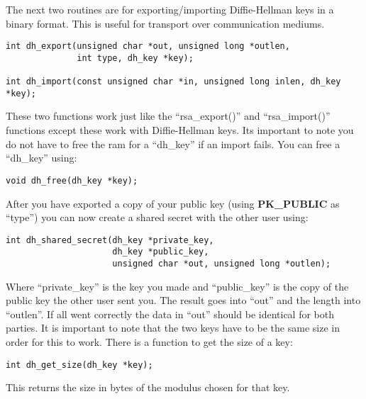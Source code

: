 \documentclass[b5paper]{book}
\begin{document}
The next two routines are for exporting/importing Diffie-Hellman keys in a binary format.  This is useful for transport
over communication mediums.  

 
\begin{verbatim}
int dh_export(unsigned char *out, unsigned long *outlen, 
              int type, dh_key *key);

int dh_import(const unsigned char *in, unsigned long inlen, dh_key *key);
\end{verbatim}

These two functions work just like the ``rsa\_export()'' and ``rsa\_import()'' functions except these work with 
Diffie-Hellman keys. Its important to note you do not have to free the ram for a ``dh\_key'' if an import fails.  You can free a 
``dh\_key'' using:
\begin{verbatim}
void dh_free(dh_key *key);
\end{verbatim}
After you have exported a copy of your public key (using {\bf PK\_PUBLIC} as ``type'') you can now create a shared secret 
with the other user using:
\begin{verbatim}
int dh_shared_secret(dh_key *private_key, 
                     dh_key *public_key, 
                     unsigned char *out, unsigned long *outlen);
\end{verbatim}

Where ``private\_key'' is the key you made and ``public\_key'' is the copy of the public key the other user sent you.  The result goes
into ``out'' and the length into ``outlen''.  If all went correctly the data in ``out'' should be identical for both parties.  It is important to
note that the two keys have to be the same size in order for this to work.  There is a function to get the size of a
key:
\begin{verbatim}
int dh_get_size(dh_key *key);
\end{verbatim}
This returns the size in bytes of the modulus chosen for that key.
\end{document}
